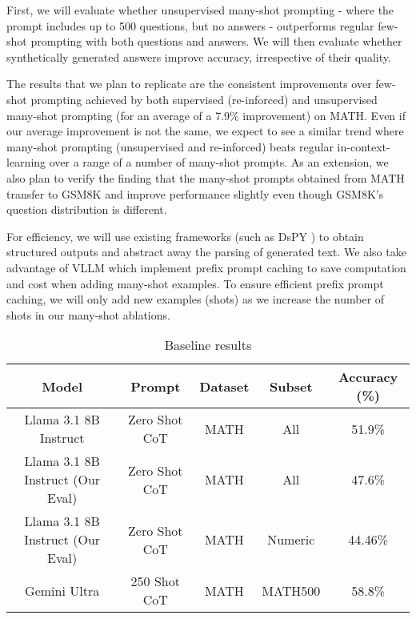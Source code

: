 \documentclass[twocolumn,11pt]{article}
\begin{document}
First, we will evaluate whether unsupervised many-shot prompting - where the prompt includes up to 500 questions, but no answers - outperforms regular few-shot prompting with both questions and answers. We will then evaluate whether synthetically generated answers improve accuracy, irrespective of their quality.

The results that we plan to replicate are the consistent improvements over few-shot prompting achieved by both supervised (re-inforced) and unsupervised many-shot prompting (for an average of a 7.9\% improvement) on MATH. Even if our average improvement is not the same, we expect to see a similar trend where many-shot prompting (unsupervised and re-inforced) beats regular in-context-learning over a range of a number of many-shot prompts. As an extension, we also plan to verify the finding that the many-shot prompts obtained from MATH transfer to GSM8K and improve performance slightly even though GSM8K's question distribution is different.

For efficiency, we will use existing frameworks (such as DsPY \cite{khattab2023dspycompilingdeclarativelanguage}) to obtain structured outputs and abstract away the parsing of generated text. We also take advantage of VLLM \cite{kwon2023efficientmemorymanagementlarge} which implement prefix prompt caching to save computation and cost when adding many-shot examples. To ensure efficient prefix prompt caching, we will only add new examples (shots) as we increase the number of shots in our many-shot ablations.

\begin{table*}
    \centering
    \begin{tabular}{|c|c|c|c|c|}
        \hline
        \textbf{Model} & \textbf{Prompt} & \textbf{Dataset} & \textbf{Subset} & \textbf{Accuracy (\%)}\\
        \hline
        Llama 3.1 8B Instruct \cite{dubey2024llama3herdmodels} & Zero Shot CoT & MATH & All & 51.9\% \\
        \hline
        Llama 3.1 8B Instruct (Our Eval) & Zero Shot CoT & MATH & All & 47.6\% \\
        \hline
        Llama 3.1 8B Instruct (Our Eval) & Zero Shot CoT & MATH & Numeric &  44.46\%\\
        \hline
        Gemini Ultra \cite{agarwal2024manyshotincontextlearning} & 250 Shot CoT & MATH & MATH500 & 58.8\% \\
        \hline
    \end{tabular}
    \caption{Baseline results}
    \label{tab:baseline_results}
\end{table*}
\end{document}
